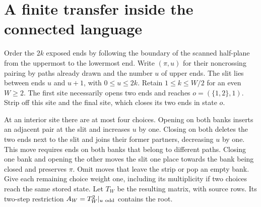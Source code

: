 \documentclass[11pt]{article}
\begin{document}
\newpage
\section{A finite transfer inside the connected language}
Order the \(2k\) exposed ends by following the boundary of the scanned half-plane from the uppermost to the lowermost end. Write \((\pi,u)\) for their noncrossing pairing by paths already drawn and the number \(u\) of upper ends. The slit lies between ends \(u\) and \(u+1\), with \(0\le u\le 2k\). Retain \(1\le k\le W/2\) for an even \(W\ge2\). The first site necessarily opens two ends and reaches \(o=(\{1,2\},1)\). Strip off this site and the final site, which closes its two ends in state \(o\).

At an interior site there are at most four choices. Opening on both banks inserts an adjacent pair at the slit and increases \(u\) by one. Closing on both deletes the two ends next to the slit and joins their former partners, decreasing \(u\) by one. This move requires ends on both banks that belong to different paths. Closing one bank and opening the other moves the slit one place towards the bank being closed and preserves \(\pi\). Omit moves that leave the strip or pop an empty bank. Give each remaining choice weight one, including its multiplicity if two choices reach the same stored state. Let \(T_W\) be the resulting matrix, with source rows. Its two-step restriction \(A_W=T_W^2|_{u\ {\rm odd}}\) contains the root.
\end{document}
